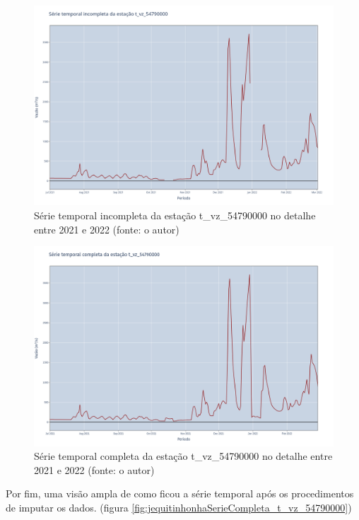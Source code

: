 \begin{figure}[!h]
\centering
\includegraphics[scale=0.25]{Figuras/jequiti/jequitinhonhaSerieIncompleta_t_vz_54790000-2021_2022.png}
\caption{Série temporal incompleta da estação t\_vz\_54790000 no detalhe entre 2021 e 2022 (fonte: o autor)}
\label{fig:jequitinhonhaSerieIncompleta_t_vz_54790000-2021_2022}
\end{figure}

\begin{figure}[!h]
\centering
\includegraphics[scale=0.25]{Figuras/jequiti/jequitinhonhaSerieCompleta_t_vz_54790000-2021_2022.png}
\caption{Série temporal completa da estação t\_vz\_54790000 no detalhe entre 2021 e 2022 (fonte: o autor)}
\label{fig:jequitinhonhaSerieCompleta_t_vz_54790000-2021_2022}
\end{figure}

Por fim, uma visão ampla de como ficou a série temporal após os procedimentos de imputar os dados. (figura \ref{fig:jequitinhonhaSerieCompleta_t_vz_54790000})

